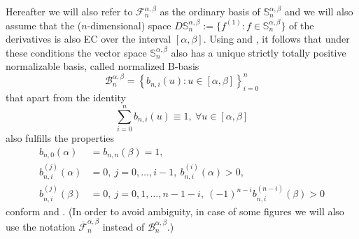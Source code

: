 \documentclass[b5paper, twosided]{book}
\begin{document}
Hereafter we will also refer to $\mathcal{F}_{n}^{\alpha,\beta}$ as the
ordinary basis of $\mathbb{S}_{n}^{\alpha,\beta}$ and we will also assume that the ($n$-dimensional) space
$
D\mathbb{S}_{n}^{\alpha,\beta}:=
\big\{
f^{\left(1\right)} 
: f \in \mathbb{S}_{n}^{\alpha,\beta}
\big\}
$
of the derivatives 
is also EC over the interval $\left[\alpha,\beta\right]$. Using \cite[Theorem
5.1]{CarnicerPena1995} and \cite[Theorem 4.1]{CarnicerMainarPena2004}, it follows that under these conditions the vector space $\mathbb{S}_{n}^{\alpha,\beta}$ also has a unique
strictly totally positive normalizable basis,
called normalized B-basis
\begin{equation}
    \mathcal{B}_{n}^{\alpha,\beta}=\left\{  b_{n,i}\left(  u\right)  :u\in\left[
    \alpha,\beta\right]  \right\}  _{i=0}^{n} \label{eq:B-basis}%
\end{equation}
that apart from the identity%
\begin{equation}
    \sum_{i=0}^{n}b_{n,i}\left(  u\right)  \equiv1,~\forall u\in\left[
    \alpha,\beta\right]  \label{eq:partition_of_unity}%
\end{equation}
also fulfills the properties%
\begin{align}
    b_{n,0}\left(  \alpha\right)   &  =b_{n,n}\left(  \beta\right)
    =1,\label{eq:endpoint_interpolation}\\
    b_{n,i}^{\left(  j\right)  }\left(  \alpha\right)   &  =0,~j=0,\ldots
    ,i-1,~b_{n,i}^{\left(  i\right)  }\left(  \alpha\right)
    >0,\label{eq:Hermite_conditions_0}\\
    b_{n,i}^{\left(  j\right)  }\left(  \beta\right)   &  =0,~j=0,1,\ldots
    ,n-1-i,~\left(  -1\right)  ^{n-i}b_{n,i}^{\left(  n-i\right)  }\left(
    \beta\right)  >0 \label{eq:Hermite_conditions_alpha}%
\end{align}
conform \cite[Theorem 5.1]{CarnicerPena1995} and \cite[Equation (3.6)]{Mazure1999}. (In order to avoid ambiguity, in case of some figures we will also use the notation $\overline{\mathcal{F}}_n^{\alpha,\beta}$ instead of $\mathcal{B}_n^{\alpha,\beta}$.)
\end{document}
